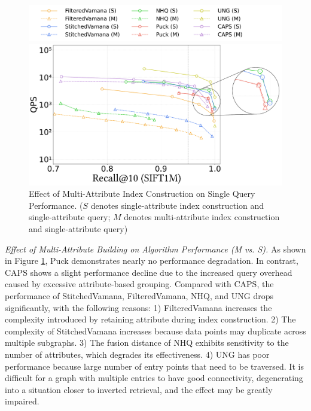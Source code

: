 \documentclass[sigconf, nonacm]{acmart}
\begin{document}
	\begin{figure}[t]
		\centering
		\setlength{\abovecaptionskip}{0.1cm}
		\setlength{\belowcaptionskip}{-0.1cm}
		\hspace*{15pt} %
		\includegraphics[width=0.95\columnwidth]{figures/exp/exp_2_legend.pdf} %
		
		
		\includegraphics[width=0.7\columnwidth]{figures/exp/exp_2_1.pdf}
		\caption{Effect of Multi-Attribute Index Construction on Single Query Performance. ($S$ denotes single-attribute index construction and single-attribute query; $M$ denotes multi-attribute index construction and single-attribute query)}
		\label{fig:exp_2_1}
		
	\end{figure}
	
	\textit{Effect of Multi-Attribute Building on Algorithm Performance (M vs. S).}
	As shown in Figure \ref{fig:exp_2_1}, Puck demonstrates nearly no performance degradation. In contrast, CAPS shows a slight performance decline due to the increased query overhead caused by excessive attribute-based grouping. Compared with CAPS, the performance of StitchedVamana, FilteredVamana, NHQ, and UNG drops significantly, with the following reasons: 1) FilteredVamana increases the complexity introduced by retaining attribute during index construction. 2) The complexity of StitchedVamana increases because data points may duplicate across multiple subgraphs. 3) The fusion distance of NHQ exhibits sensitivity to the number of attributes, which degrades its effectiveness. 4) UNG has poor performance because large number of entry points that need to be traversed. It is difficult for a graph with multiple entries to have good connectivity, degenerating into a situation closer to inverted retrieval, and the effect may be greatly impaired.
	
\end{document}
